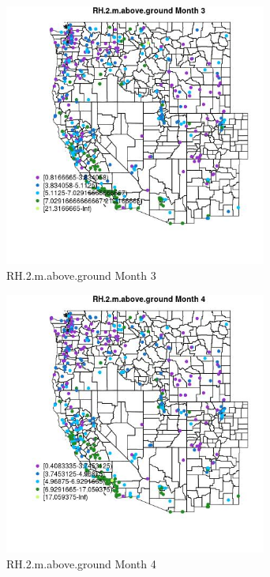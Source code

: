 \begin{figure} 
\centering  
\includegraphics[width=0.77\textwidth]{Code_Outputs/ML_input_report_ML_input_PM25_Step5_part_d_de_duplicated_aves_ML_input_MapObsMo3RH2maboveground.jpg} 
\caption{\label{fig:ML_input_report_ML_input_PM25_Step5_part_d_de_duplicated_aves_ML_inputMapObsMo3RH2maboveground}RH.2.m.above.ground Month 3} 
\end{figure} 
 

\begin{figure} 
\centering  
\includegraphics[width=0.77\textwidth]{Code_Outputs/ML_input_report_ML_input_PM25_Step5_part_d_de_duplicated_aves_ML_input_MapObsMo4RH2maboveground.jpg} 
\caption{\label{fig:ML_input_report_ML_input_PM25_Step5_part_d_de_duplicated_aves_ML_inputMapObsMo4RH2maboveground}RH.2.m.above.ground Month 4} 
\end{figure} 
 

